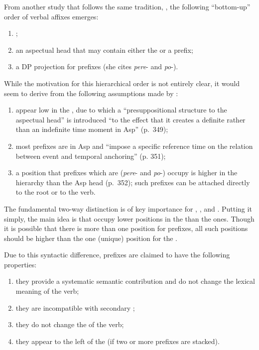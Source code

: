 From another study that follows the same tradition, \citealt{Ramchand:04}, the following ``bottom-up'' order of verbal affixes emerges:

\begin{enumerate}
\item {};
\item an aspectual head that may contain either the  or a  prefix;
\item a DP projection for   prefixes (she cites \textit{pere}- and \textit{po}-). 
\end{enumerate}
While the motivation for this hierarchical order is not entirely clear, it would seem to derive from the following assumptions made by \citet{Ramchand:04}: 
\begin{enumerate}
\item {} appear low in the , due to which a ``presuppositional structure to the aspectual head'' is introduced ``to the effect that it creates a definite rather than an indefinite time moment in Asp'' (p.~349);
\item most  prefixes are in Asp and ``impose a specific reference time on the relation between event and temporal anchoring'' (p. 351);
\item a position that  prefixes which are  (\textit{pere}- and  \textit{po}-) occupy is higher in the hierarchy than the Asp head (p.~352); such prefixes can be attached directly to the root or to the  verb.
\end{enumerate}
The fundamental two-way distinction is of key importance for \citet{Romanova:04}, \citet{Svenonius:04b}, and \citet{Ramchand:04}. Putting it simply, the main idea is that  occupy lower positions in the  than the  ones. Though it is possible that there is more than one position for  prefixes, all such positions should be higher than the one (unique) position for the . 

Due to this syntactic difference,  prefixes are claimed to have the following properties:
\begin{enumerate}
\item they provide a systematic semantic contribution and do not change the lexical meaning of the verb;
\item they are incompatible with secondary ;
\item they do not change the  of the verb;
\item they appear to the left of the  (if two or more prefixes are stacked). 
\end{enumerate}

